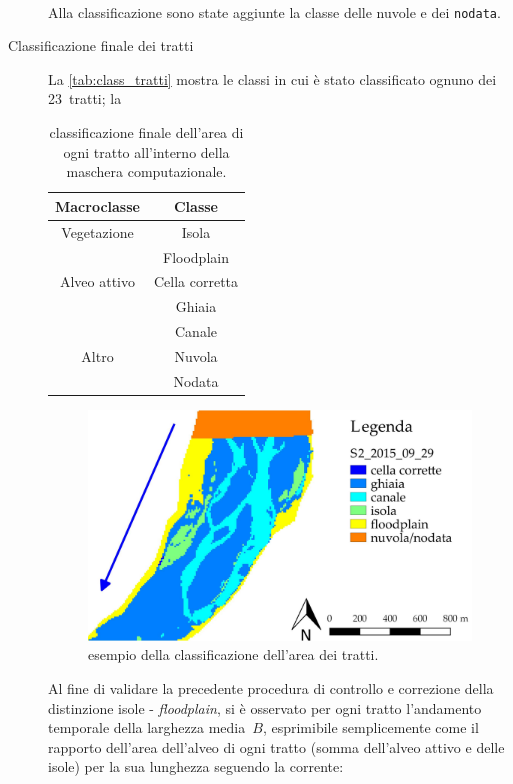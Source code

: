 \begin{description}
	\\
	Alla classificazione sono state aggiunte la classe delle nuvole e dei \texttt{nodata}.
	\item[Classificazione finale dei tratti] La \vref{tab:class_tratti} mostra le classi in cui è stato classificato ognuno dei 23~tratti; la %
	\begin{table}[ht]
		\centering
		\begin{tabular}{
			c 
			c
			}
			\toprule
			\textbf{Macroclasse}	&	\textbf{Classe}	\\
			\midrule
			Vegetazione		&	Isola	\\
							&	Floodplain	\\
			Alveo attivo	&	Cella corretta	\\
							&	Ghiaia	\\
							&	Canale	\\
			Altro			&	Nuvola	\\
							&	Nodata	\\
			\bottomrule
		\end{tabular}
		\caption[classificazione dell'area dei tratti]{classificazione finale dell'area di ogni tratto all'interno della maschera computazionale.}
		\label{tab:class_tratti}
	\end{table}
	\begin{figure}[ht]
		\centering
		\includegraphics[width=.8\textwidth]{files/esempio_class_is_fl.jpeg}
		\caption[esempio della classificazione dell'area dei tratti]{esempio della classificazione dell'area dei tratti.}
		\label{fig:class_is_fl}
	\end{figure}
	Al fine di validare la precedente procedura di controllo e correzione della distinzione isole - \emph{floodplain}, si è osservato per ogni tratto l'andamento temporale della larghezza media~$B$, esprimibile semplicemente come il rapporto dell'area dell'alveo di ogni tratto (somma dell'alveo attivo e delle isole) per la sua lunghezza seguendo la corrente:

\end{description}
